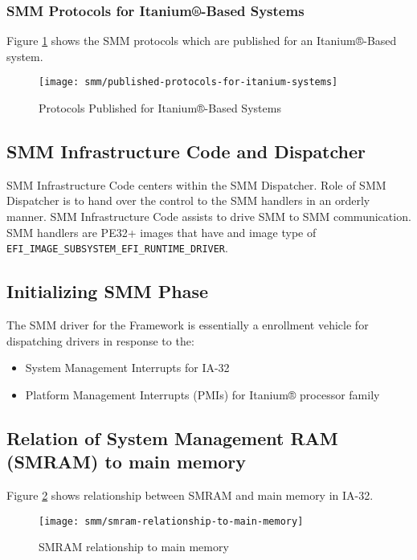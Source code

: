 \subsubsection{SMM Protocols for Itanium®-Based Systems}
Figure \ref{fig:published-protocols-for-itanium-systems} shows the SMM protocols which are published for an Itanium®-Based system.
\begin{figure}[!htbp]
	\centering
	\texttt{[image: smm/published-protocols-for-itanium-systems]}
	\caption{Protocols Published for Itanium®-Based Systems}\label{fig:published-protocols-for-itanium-systems}
\end{figure}


\subsection{SMM Infrastructure Code and Dispatcher}
SMM Infrastructure Code centers within the SMM Dispatcher. Role of SMM Dispatcher is to hand over the control to the SMM handlers in an orderly manner. SMM Infrastructure Code assists to drive SMM to SMM communication. SMM handlers are PE32+ images that have and image type of \verb|EFI_IMAGE_SUBSYSTEM_EFI_RUNTIME_DRIVER|.

\subsection{Initializing SMM Phase}
The SMM driver for the Framework is essentially a enrollment vehicle for dispatching drivers in response to the:
\begin{itemize}
	\item System Management Interrupts for IA-32
	\item Platform Management Interrupts (PMIs) for Itanium® processor family
\end{itemize}

\subsection{Relation of System Management RAM (SMRAM) to main memory}
Figure \ref{fig:smram-relationship-to-main-memory} shows relationship between SMRAM and main memory in IA-32.

\begin{figure}[!htbp]
	\centering
	\texttt{[image: smm/smram-relationship-to-main-memory]}
	\caption{SMRAM relationship to main memory}\label{fig:smram-relationship-to-main-memory}
\end{figure}

